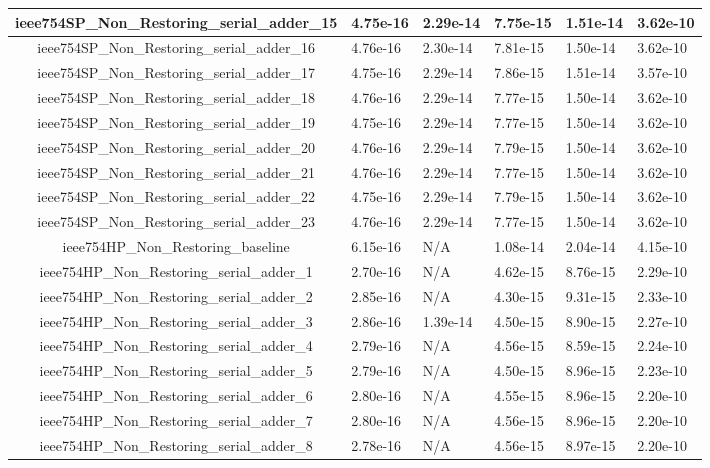 \begin{tabularx}{\linewidth}{|c|X|X|X|X|X|}
ieee754SP\_Non\_Restoring\_serial\_adder\_15 & 4.75e-16 & 2.29e-14 & 7.75e-15 & 1.51e-14 & 3.62e-10\\ \hline
ieee754SP\_Non\_Restoring\_serial\_adder\_16 & 4.76e-16 & 2.30e-14 & 7.81e-15 & 1.50e-14 & 3.62e-10\\ \hline
ieee754SP\_Non\_Restoring\_serial\_adder\_17 & 4.75e-16 & 2.29e-14 & 7.86e-15 & 1.51e-14 & 3.57e-10\\ \hline
ieee754SP\_Non\_Restoring\_serial\_adder\_18 & 4.76e-16 & 2.29e-14 & 7.77e-15 & 1.50e-14 & 3.62e-10\\ \hline
ieee754SP\_Non\_Restoring\_serial\_adder\_19 & 4.75e-16 & 2.29e-14 & 7.77e-15 & 1.50e-14 & 3.62e-10\\ \hline
ieee754SP\_Non\_Restoring\_serial\_adder\_20 & 4.76e-16 & 2.29e-14 & 7.79e-15 & 1.50e-14 & 3.62e-10\\ \hline
ieee754SP\_Non\_Restoring\_serial\_adder\_21 & 4.76e-16 & 2.29e-14 & 7.77e-15 & 1.50e-14 & 3.62e-10\\ \hline
ieee754SP\_Non\_Restoring\_serial\_adder\_22 & 4.75e-16 & 2.29e-14 & 7.79e-15 & 1.50e-14 & 3.62e-10\\ \hline
ieee754SP\_Non\_Restoring\_serial\_adder\_23 & 4.76e-16 & 2.29e-14 & 7.77e-15 & 1.50e-14 & 3.62e-10\\ \hline
ieee754HP\_Non\_Restoring\_baseline & 6.15e-16 & N/A & 1.08e-14 & 2.04e-14 & 4.15e-10\\ \hline
ieee754HP\_Non\_Restoring\_serial\_adder\_1 & 2.70e-16 & N/A & 4.62e-15 & 8.76e-15 & 2.29e-10\\ \hline
ieee754HP\_Non\_Restoring\_serial\_adder\_2 & 2.85e-16 & N/A & 4.30e-15 & 9.31e-15 & 2.33e-10\\ \hline
ieee754HP\_Non\_Restoring\_serial\_adder\_3 & 2.86e-16 & 1.39e-14 & 4.50e-15 & 8.90e-15 & 2.27e-10\\ \hline
ieee754HP\_Non\_Restoring\_serial\_adder\_4 & 2.79e-16 & N/A & 4.56e-15 & 8.59e-15 & 2.24e-10\\ \hline
ieee754HP\_Non\_Restoring\_serial\_adder\_5 & 2.79e-16 & N/A & 4.50e-15 & 8.96e-15 & 2.23e-10\\ \hline
ieee754HP\_Non\_Restoring\_serial\_adder\_6 & 2.80e-16 & N/A & 4.55e-15 & 8.96e-15 & 2.20e-10\\ \hline
ieee754HP\_Non\_Restoring\_serial\_adder\_7 & 2.80e-16 & N/A & 4.56e-15 & 8.96e-15 & 2.20e-10\\ \hline
ieee754HP\_Non\_Restoring\_serial\_adder\_8 & 2.78e-16 & N/A & 4.56e-15 & 8.97e-15 & 2.20e-10\\ \hline

\end{tabularx}
